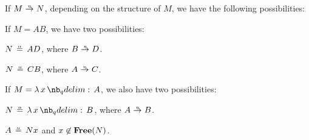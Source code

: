 \begin{lemma}\label{thm:eta_reduction_deconstruction}
  If \( M \ered N \), depending on the structure of \( M \), we have the following possibilities:
  \begin{thmenum}
     If \( M = AB \), we have two possibilities:
    \begin{thmenum}
       \( N \aequiv AD \), where \( B \ered D \).

       \( N \aequiv CB \), where \( A \ered C \).
    \end{thmenum}

     If \( M = \qabs x A \), we also have two possibilities:
    \begin{thmenum}
       \( N \aequiv \qabs x B \), where \( A \ered B \).

       \( A \aequiv Nx \) and \( x \not\in \op*{Free}(N) \).
    \end{thmenum}
  \end{thmenum}
\end{lemma}

